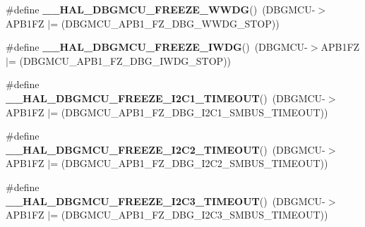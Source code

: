 \begin{DoxyCompactItemize}
\item 
\#define {\bfseries \+\_\+\+\_\+\+H\+A\+L\+\_\+\+D\+B\+G\+M\+C\+U\+\_\+\+F\+R\+E\+E\+Z\+E\+\_\+\+W\+W\+DG}()~(D\+B\+G\+M\+CU-\/$>$A\+P\+B1\+FZ $\vert$= (D\+B\+G\+M\+C\+U\+\_\+\+A\+P\+B1\+\_\+\+F\+Z\+\_\+\+D\+B\+G\+\_\+\+W\+W\+D\+G\+\_\+\+S\+T\+OP))\hypertarget{group___h_a_l___exported___macros_ga81215154725c479c67fb1adac906fbd9}{}\label{group___h_a_l___exported___macros_ga81215154725c479c67fb1adac906fbd9}

\item 
\#define {\bfseries \+\_\+\+\_\+\+H\+A\+L\+\_\+\+D\+B\+G\+M\+C\+U\+\_\+\+F\+R\+E\+E\+Z\+E\+\_\+\+I\+W\+DG}()~(D\+B\+G\+M\+CU-\/$>$A\+P\+B1\+FZ $\vert$= (D\+B\+G\+M\+C\+U\+\_\+\+A\+P\+B1\+\_\+\+F\+Z\+\_\+\+D\+B\+G\+\_\+\+I\+W\+D\+G\+\_\+\+S\+T\+OP))\hypertarget{group___h_a_l___exported___macros_gabab7ab631ba58fb6246a9385e8af9d0d}{}\label{group___h_a_l___exported___macros_gabab7ab631ba58fb6246a9385e8af9d0d}

\item 
\#define {\bfseries \+\_\+\+\_\+\+H\+A\+L\+\_\+\+D\+B\+G\+M\+C\+U\+\_\+\+F\+R\+E\+E\+Z\+E\+\_\+\+I2\+C1\+\_\+\+T\+I\+M\+E\+O\+UT}()~(D\+B\+G\+M\+CU-\/$>$A\+P\+B1\+FZ $\vert$= (D\+B\+G\+M\+C\+U\+\_\+\+A\+P\+B1\+\_\+\+F\+Z\+\_\+\+D\+B\+G\+\_\+\+I2\+C1\+\_\+\+S\+M\+B\+U\+S\+\_\+\+T\+I\+M\+E\+O\+UT))\hypertarget{group___h_a_l___exported___macros_ga6160f642dcff812be3a04c5b5c66e31d}{}\label{group___h_a_l___exported___macros_ga6160f642dcff812be3a04c5b5c66e31d}

\item 
\#define {\bfseries \+\_\+\+\_\+\+H\+A\+L\+\_\+\+D\+B\+G\+M\+C\+U\+\_\+\+F\+R\+E\+E\+Z\+E\+\_\+\+I2\+C2\+\_\+\+T\+I\+M\+E\+O\+UT}()~(D\+B\+G\+M\+CU-\/$>$A\+P\+B1\+FZ $\vert$= (D\+B\+G\+M\+C\+U\+\_\+\+A\+P\+B1\+\_\+\+F\+Z\+\_\+\+D\+B\+G\+\_\+\+I2\+C2\+\_\+\+S\+M\+B\+U\+S\+\_\+\+T\+I\+M\+E\+O\+UT))\hypertarget{group___h_a_l___exported___macros_gacc31f8475c2e3e30ee99e53814faa523}{}\label{group___h_a_l___exported___macros_gacc31f8475c2e3e30ee99e53814faa523}

\item 
\#define {\bfseries \+\_\+\+\_\+\+H\+A\+L\+\_\+\+D\+B\+G\+M\+C\+U\+\_\+\+F\+R\+E\+E\+Z\+E\+\_\+\+I2\+C3\+\_\+\+T\+I\+M\+E\+O\+UT}()~(D\+B\+G\+M\+CU-\/$>$A\+P\+B1\+FZ $\vert$= (D\+B\+G\+M\+C\+U\+\_\+\+A\+P\+B1\+\_\+\+F\+Z\+\_\+\+D\+B\+G\+\_\+\+I2\+C3\+\_\+\+S\+M\+B\+U\+S\+\_\+\+T\+I\+M\+E\+O\+UT))\hypertarget{group___h_a_l___exported___macros_gacd3fd0373b45de1b86be07bd4007c30e}{}\label{group___h_a_l___exported___macros_gacd3fd0373b45de1b86be07bd4007c30e}


\end{DoxyCompactItemize}
